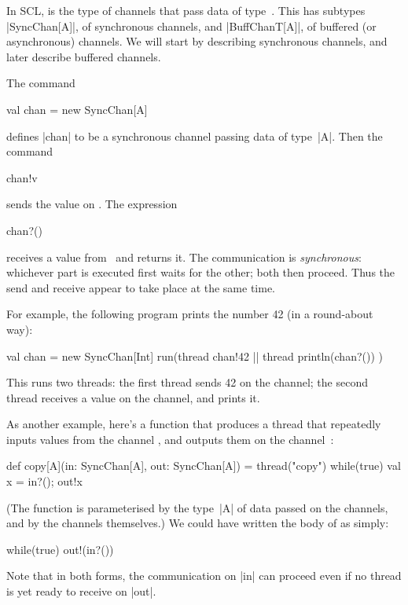 

In SCL,  is the type of channels that pass data of
type~.  This has  subtypes |SyncChan[A]|, of synchronous
channels, and |BuffChanT[A]|, of buffered (or asynchronous) channels.  We will
start by describing synchronous channels, and later describe buffered
channels. 

The command
\begin{scala}
  val chan = new SyncChan[A]
\end{scala}
defines |chan| to be a synchronous channel passing data of type~|A|.  Then the
command 
\begin{scala}
  chan!v
\end{scala}
sends the value  on .  The expression
\begin{scala}
  chan?()
\end{scala}
receives a value from~ and returns it.  The communication is
\emph{synchronous}: whichever part is executed first waits for the other; both
then proceed.  Thus the send and receive appear to take place at the same
time.  


For example, the following program prints the number 42 (in a round-about
way): 
\begin{scala}
  val chan = new SyncChan[Int]
  run(thread{ chan!42 } || thread{ println(chan?()) }) 
\end{scala}
%
This runs two threads: the first thread sends 42 on the channel; the second
thread receives a value on the channel, and prints it.


As another example, here's a function that produces a thread that repeatedly
inputs values from the channel , and outputs them on the
channel~:
%
\begin{scala}
def copy[A](in: SyncChan[A], out: SyncChan[A]) = thread("copy"){
  while(true){ val x = in?(); out!x }
}
\end{scala}
%
(The function is parameterised by the type~|A| of data passed on the channels,
and by the channels themselves.)
%
We could have written the body of  as simply:
\begin{scala}
  while(true) out!(in?()) 
\end{scala}
Note that in both forms, the communication on |in| can proceed even if no
thread is yet ready to receive on |out|.

